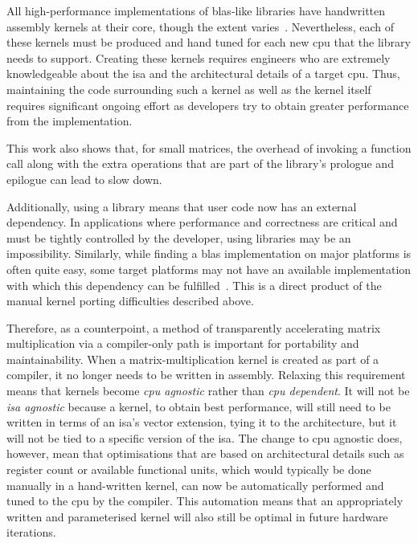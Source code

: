 \documentclass[\main/thesis.tex]{subfiles}
\begin{document}
All high-performance implementations of \gls{blas}-like libraries have handwritten assembly kernels at their core, though the extent varies~\autocite{zee2016blis}.
Nevertheless, each of these kernels must be produced and hand tuned for each new \gls{cpu} that the library needs to support.
Creating these kernels requires engineers who are extremely knowledgeable about the \gls{isa} and the architectural details of a target \gls{cpu}.
Thus, maintaining the code surrounding such a kernel as well as the kernel itself requires significant ongoing effort as developers try to obtain greater performance from the implementation.

This work also shows that, for small matrices, the overhead of invoking a function call along with the extra operations that are part of the library's prologue and epilogue can lead to slow down.

Additionally, using a library means that user code now has an external dependency.
In applications where performance and correctness are critical and must be tightly controlled by the developer, using libraries may be an impossibility.
Similarly, while finding a \gls{blas} implementation on major platforms is often quite easy, some target platforms may not have an available implementation with which this dependency can be fulfilled~\autocite{zee2016blis}.
This is a direct product of the manual kernel porting difficulties described above.

Therefore, as a counterpoint, a method of transparently accelerating matrix multiplication via a compiler-only path is important for portability and maintainability.
When a matrix-multiplication kernel is created as part of a compiler, it no longer needs to be written in assembly.
Relaxing this requirement means that kernels become \emph{\gls{cpu} agnostic} rather than \emph{\gls{cpu} dependent}.
It will not be \emph{\gls{isa} agnostic} because a kernel, to obtain best performance, will still need to be written in terms of an \gls{isa}'s vector extension, tying it to the architecture, but it will not be tied to a specific version of the \gls{isa}.
The change to \gls{cpu} agnostic does, however, mean that  optimisations that are based on architectural details such as register count or available functional units, which would typically be done manually in a hand-written kernel, can now be automatically performed and tuned to the \gls{cpu} by the compiler.
This automation means that an appropriately written and parameterised kernel will also still be optimal in future hardware iterations.
\end{document}
